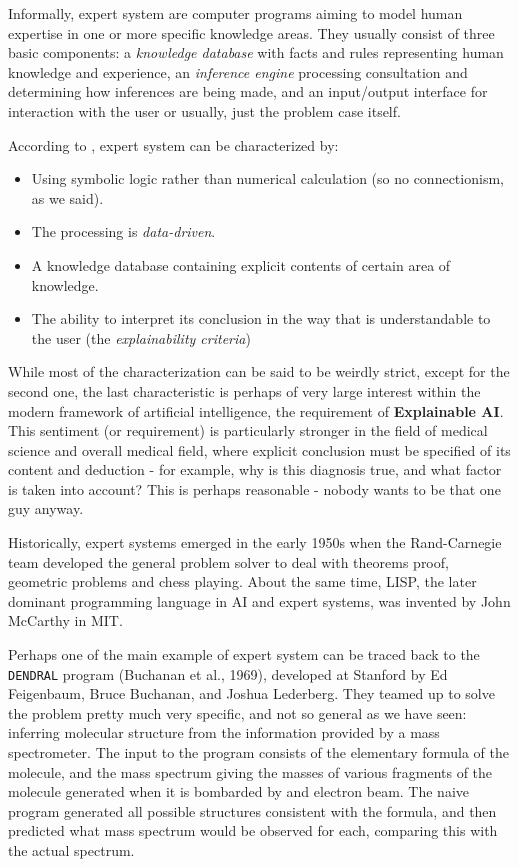 Informally, expert system are computer programs aiming to model human expertise in one or more specific knowledge areas. They usually consist of three basic components: a \textit{knowledge database}  with facts and rules representing human knowledge and experience, an \textit{inference engine} processing consultation and determining how inferences are being made, and an input/output interface for interaction with the user or usually, just the problem case itself. 

According to \cite{articleMetaxiotis}, expert system can be characterized by: 
\begin{itemize}
    \item Using symbolic logic rather than numerical calculation (so no connectionism, as we said). 
    \item The processing is \textit{data-driven}. 
    \item A knowledge database containing explicit contents of certain area of knowledge. 
    \item The ability to interpret its conclusion in the way that is understandable to the user (the \textit{explainability criteria})
\end{itemize}
While most of the characterization can be said to be weirdly strict, except for the second one, the last characteristic is perhaps of very large interest within the modern framework of artificial intelligence, the requirement of \textbf{Explainable AI}. This sentiment (or requirement) is particularly stronger in the field of medical science and overall medical field, where explicit conclusion must be specified of its content and deduction - for example, why is this diagnosis true, and what factor is taken into account? This is perhaps reasonable - nobody wants to be that one guy anyway. 

Historically, expert systems emerged in the early 1950s when the Rand-Carnegie team developed the general problem solver to deal with theorems proof, geometric problems and chess playing. About the same time, LISP, the later dominant programming language in AI and expert systems, was invented by John McCarthy in MIT. 

Perhaps one of the main example of expert system can be traced back to the \texttt{DENDRAL} program (Buchanan et al., 1969), developed at Stanford by Ed Feigenbaum, Bruce Buchanan, and Joshua Lederberg. They teamed up to solve the problem pretty much very specific, and not so general as we have seen: inferring molecular structure from the information provided by a mass spectrometer. The input to the program consists of the elementary formula of the molecule, and the mass spectrum giving the masses of various fragments of the molecule generated when it is bombarded by and electron beam. The naive program generated all possible structures consistent with the formula, and then predicted what mass spectrum would be observed for each, comparing this with the actual spectrum. 

